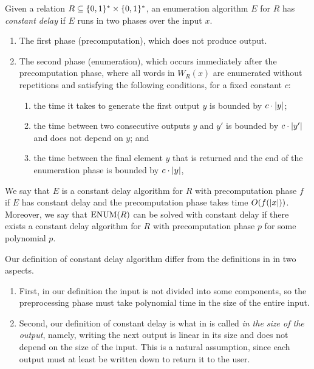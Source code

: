 \documentclass[11pt,twoside=off,numbers=noenddot]{scrbook}
\begin{document}
\begin{definition}
    Given a relation $R \subseteq \{ 0, 1 \}^\ast \times \{ 0, 1 \}^\ast$, an enumeration algorithm $E$ for $R$ has \emph{constant delay} if $E$ runs in two phases over the input $x$.
    \begin{enumerate}
        \item The first phase (precomputation), which does not produce output.
        \item The second phase (enumeration), which occurs immediately after the precomputation phase, where all words in $W_R(x)$ are enumerated without repetitions and satisfying the following conditions, for a fixed constant $c$:
              \begin{enumerate}
                  \item the time it takes to generate the first output $y$ is bounded by $c \cdot | y |$;
                  \item the time between two consecutive outputs $y$ and $y'$ is bounded by $c \cdot | y' |$ and does not depend on $y$; and
                  \item the time between the final element $y$ that is returned and the end of the enumeration phase is bounded by $c \cdot | y |$,
              \end{enumerate}
    \end{enumerate}
    We say that $E$ is a constant delay algorithm for $R$ with precomputation phase $f$ if $E$ has constant delay and the precomputation phase takes time $O(f(| x |))$. Moreover, we say that $\text{ENUM}(R)$ can be solved with constant delay if there exists a constant delay algorithm for $R$ with precomputation phase $p$ for some polynomial $p$.
\end{definition}

Our definition of constant delay algorithm differ from the definitions in \cite{segoufin2013enumerating} in two aspects.
\begin{enumerate}
    \item First, in our definition the input is not divided into some components, so the preprocessing phase must take polynomial time in the size of the entire input.
    \item Second, our definition of constant delay is what in \cite{bagan2006mso,courcelle2009linear} is called \emph{ in the size of the output}, namely, writing the next output is linear in its size and does not depend on the size of the input. This is a natural assumption, since each output must at least be written down to return it to the user.
\end{enumerate}
\end{document}

